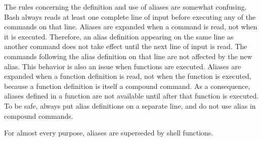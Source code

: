 The rules concerning the definition and use of aliases are somewhat confusing. Bash always reads at least one complete line of input before executing any of the commands on that line. Aliases are expanded when a command is read, not when it is executed. Therefore, an alias definition appearing on the same line as another command does not take effect until the next line of input is read. The commands following the alias definition on that line are not affected by the new alias. This behavior is also an issue when functions are executed. Aliases are expanded when a function definition is read, not when the function is executed, because a function definition is itself a compound command. As a consequence, aliases defined in a function are not available until after that function is executed. To be safe, always put alias definitions on a separate line, and do not use alias in compound commands.

For almost every purpose, aliases are superseded by shell functions.